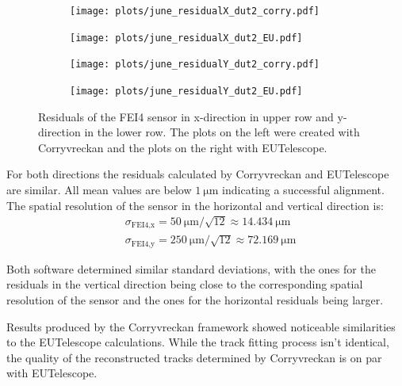 \begin{figure}
  \hspace{-2.5cm}
  \begin{subfigure}{0.62\textwidth}
      \texttt{[image: plots/june\_residualX\_dut2\_corry.pdf]}
  \end{subfigure}
  \begin{subfigure}{0.62\textwidth}
      \hspace{0.95cm}
      \texttt{[image: plots/june\_residualX\_dut2\_EU.pdf]}
  \end{subfigure}
  \begin{subfigure}{0.62\textwidth}
    \hspace{-2.5cm}
      \texttt{[image: plots/june\_residualY\_dut2\_corry.pdf]}
  \end{subfigure}
  \begin{subfigure}{0.62\textwidth}
    \hspace{-2.5cm}
      \hspace{0.95cm}
      \texttt{[image: plots/june\_residualY\_dut2\_EU.pdf]}
  \end{subfigure}
  \caption{Residuals of the FEI4 sensor in x-direction in upper row and y-direction in the lower row. The plots on the left
  were created with Corryvreckan and the plots on the right with EUTelescope.}
  \label{fig:residual_dut}
\end{figure}

For both directions the residuals calculated by Corryvreckan and EUTelescope are similar. All mean values are below $\SI{1}{\micro\meter}$
indicating a successful alignment. The spatial resolution of the sensor in the horizontal and vertical direction is:
\begin{align*}
  &\sigma_{\text{FEI4},\text{x}} = \SI{50}{\micro\meter}/\sqrt{12} \approx \SI{14.434}{\micro\meter} \\
  &\sigma_{\text{FEI4},\text{y}} = \SI{250}{\micro\meter}/\sqrt{12} \approx \SI{72.169}{\micro\meter}
\end{align*}

Both software determined similar standard deviations, with the ones for the residuals in the vertical direction being close to
the corresponding spatial resolution of the sensor and the ones for the horizontal residuals being larger.


Results produced by the Corryvreckan framework showed noticeable similarities to the EUTelescope calculations. While the track
fitting process isn't identical, the quality of the reconstructed tracks determined by Corryvreckan is on par with EUTelescope.
